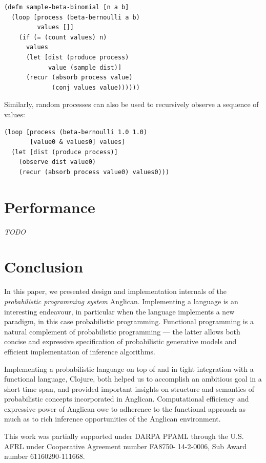 \documentclass[preprint]{sigplanconf}
\begin{document}
\begin{lstlisting}[style=default]
(defm sample-beta-binomial [n a b]
  (loop [process (beta-bernoulli a b)
         values []]
    (if (= (count values) n)
      values
      (let [dist (produce process)
            value (sample dist)]
      (recur (absorb process value)
             (conj values value))))))
\end{lstlisting}
Similarly, random processes can also be used to recursively observe a sequence of values:
\begin{lstlisting}[style=default]
(loop [process (beta-bernoulli 1.0 1.0)
       [value0 & values0] values] 
  (let [dist (produce process)]
    (observe dist value0)
    (recur (absorb process value0) values0)))
\end{lstlisting}

\section{Performance}

{\it TODO}

\section{Conclusion}
\label{seq:summary}

In this paper, we presented design and implementation internals
of the \emph{probabilistic programming system} Anglican. Implementing
a language is an interesting endeavour, in particular when the
language implements a new paradigm, in this case probabilistic
programming. Functional programming is a natural complement of
probabilistic programming --- the latter allows both concise and
expressive specification of probabilistic generative models and
efficient implementation of inference algorithms.

Implementing a probabilistic language on top of and in tight
integration with a functional language, Clojure, both helped
us to accomplish an ambitious goal in a short time span, and
provided important insights on structure and semantics of
probabilistic concepts incorporated in Anglican. Computational
efficiency and expressive power of Anglican owe to adherence to
the functional approach as much as to rich inference
opportunities of the Anglican environment.

\acks

This work was partially supported under DARPA PPAML through the
U.S. AFRL under Cooperative Agreement number FA8750- 14-2-0006,
Sub Award number 61160290-111668.



\end{document}
